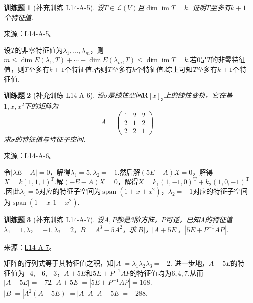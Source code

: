 \documentclass[12pt,fontset=fandol]{ctexart}
\newtheorem{exercise}{训练题}[section]
\begin{document}
\begin{exercise}[补充训练 L14-A-5]\label{prob:L14-A-5}
设$T\in \mathcal{L}(V)$且$\dim\operatorname{im} T=k$. 证明$T$至多有$k+1$个特征值.
\end{exercise}
\noindent 来源：\href{https://github.com/yhwu-is/Linear-Algebra-Left-Undone/blob/new/%E8%AE%B2%E4%B9%89/%E4%B8%93%E9%A2%98/14%20%E7%9B%B8%E4%BC%BC%E6%A0%87%E5%87%86%E5%BD%A2%EF%BC%9A%E5%8A%A8%E6%9C%BA%E4%B8%8E%E5%9F%BA%E7%A1%80.tex}{L14-A-5}。
\begin{solve}
设$T$的非零特征值为$\lambda_1,\ldots,\lambda_m$，则$m\leqslant \dim E(\lambda_1,T)+\cdots+\dim E(\lambda_m,T)\leqslant \dim\operatorname{im} T=k$.若$0$是$T$的非零特征值，则$T$至多有$k+1$个特征值.否则$T$至多有$k$个特征值.综上可知$T$至多有$k+1$个特征值.
\end{solve}

\begin{exercise}[补充训练 L14-A-6]\label{prob:L14-A-6}
设$\sigma$是线性空间$\mathbf{R}[x]_3$上的线性变换，它在基$1,x,x^2$下的矩阵为
        \[ A=\begin{pmatrix}
                1 & 2 & 2 \\ 2 & 1 & 2 \\ 2 & 2 & 1
            \end{pmatrix}\]
        求$\sigma$的特征值与特征子空间.
\end{exercise}
\noindent 来源：\href{https://github.com/yhwu-is/Linear-Algebra-Left-Undone/blob/new/%E8%AE%B2%E4%B9%89/%E4%B8%93%E9%A2%98/14%20%E7%9B%B8%E4%BC%BC%E6%A0%87%E5%87%86%E5%BD%A2%EF%BC%9A%E5%8A%A8%E6%9C%BA%E4%B8%8E%E5%9F%BA%E7%A1%80.tex}{L14-A-6}。
\begin{solve}
令$|\lambda E-A|=0$，解得$\lambda_1=5,\lambda_2=-1$.然后解$(5E-A)X=0$，解得$X=k(1,1,1)^\mathrm{T}$.解$(-E-A)X=0$，解得$X=k_1(1,-1,0)^\mathrm{T}+k_2(1,0,-1)^\mathrm{T}$.因此$\lambda_1=5$对应的特征子空间为$\operatorname{span}(1+x+x^2)$，$\lambda_2=-1$对应的特征子空间为$\operatorname{span}(1-x,1-x^2)$.
\end{solve}

\begin{exercise}[补充训练 L14-A-7]\label{prob:L14-A-7}
设$A,P$都是3阶方阵，$P$可逆，已知$A$的特征值$\lambda_1=1,\lambda_2=-1,\lambda_3=2$，$B=A^3-5A^2$，求$|B|$，$|A+5E|$，$|5E+P^{-1}AP|$.
\end{exercise}
\noindent 来源：\href{https://github.com/yhwu-is/Linear-Algebra-Left-Undone/blob/new/%E8%AE%B2%E4%B9%89/%E4%B8%93%E9%A2%98/14%20%E7%9B%B8%E4%BC%BC%E6%A0%87%E5%87%86%E5%BD%A2%EF%BC%9A%E5%8A%A8%E6%9C%BA%E4%B8%8E%E5%9F%BA%E7%A1%80.tex}{L14-A-7}。
\begin{solve}
矩阵的行列式等于其特征值之积，知$|A|=\lambda_1\lambda_2\lambda_3=-2$.
            进一步地，$A-5E$的特征值为$-4,-6,-3$，$A+5E$和$5E+P^{-1}AP$的特征值均为$6,4,7$.从而$|A-5E|=-72,|A+5E|=|5E+P^{-1}AP|=168$.
            $|B|=|A^2(A-5E)|=|A||A||A-5E|=-288$.
\end{solve}
\end{document}
